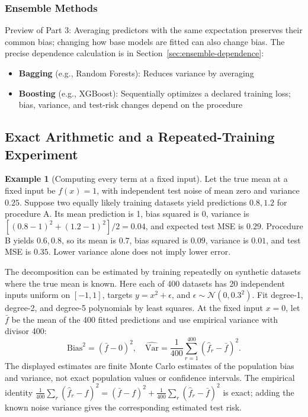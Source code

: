 \documentclass[11pt,twoside]{article}
\numberwithin{equation}{section}
\theoremstyle{plain}
\theoremstyle{definition}
\newtheorem{example}[theorem]{Example}
\theoremstyle{remark}
\begin{document}
\subsubsection{Ensemble Methods}

Preview of Part 3: Averaging predictors with the same expectation preserves their common bias; changing how base models are fitted can also change bias. The precise dependence calculation is in Section~\ref{sec:ensemble-dependence}:
\begin{itemize}
\item \textbf{Bagging} (e.g., Random Forests): Reduces variance by averaging
\item \textbf{Boosting} (e.g., XGBoost): Sequentially optimizes a declared training loss; bias, variance, and test-risk changes depend on the procedure
\end{itemize}

\subsection{Exact Arithmetic and a Repeated-Training Experiment}
\begin{example}[Computing every term at a fixed input]
Let the true mean at a fixed input be $f(x)=1$, with independent test noise of mean zero and variance $0.25$. Suppose two equally likely training datasets yield predictions $0.8,1.2$ for procedure A. Its mean prediction is 1, bias squared is 0, variance is $[(0.8-1)^2+(1.2-1)^2]/2=0.04$, and expected test MSE is $0.29$. Procedure B yields $0.6,0.8$, so its mean is $0.7$, bias squared is $0.09$, variance is $0.01$, and test MSE is $0.35$. Lower variance alone does not imply lower error.
\end{example}

The decomposition can be estimated by training repeatedly on synthetic datasets where the true mean is known. Here each of 400 datasets has 20 independent inputs uniform on $[-1,1]$, targets $y=x^2+\epsilon$, and $\epsilon\sim\mathcal N(0,0.3^2)$. Fit degree-1, degree-2, and degree-5 polynomials by least squares. At the fixed input $x=0$, let $\bar f$ be the mean of the 400 fitted predictions and use empirical variance with divisor 400:
\[
\widehat{\mathrm{Bias}^2}=(\bar f-0)^2,\quad
\widehat{\mathrm{Var}}=\frac1{400}\sum_{r=1}^{400}(\hat f_r-\bar f)^2.
\]
The displayed estimates are finite Monte Carlo estimates of the population bias and variance, not exact population values or confidence intervals. The empirical identity
$\frac1{400}\sum_r(\hat f_r-f)^2=(\bar f-f)^2+\frac1{400}\sum_r(\hat f_r-\bar f)^2$
is exact; adding the known noise variance gives the corresponding estimated test risk.
\end{document}
